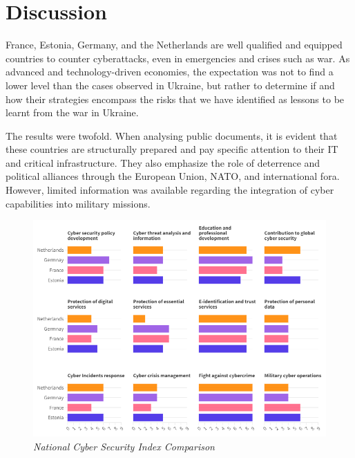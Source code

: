 \newpage

\section{Discussion}
France, Estonia, Germany, and the Netherlands are well qualified and equipped countries to counter cyberattacks, even in emergencies and crises such as war. As advanced and technology-driven economies, the expectation was not to find a lower level than the cases observed in Ukraine, but rather to determine if and how their strategies encompass the risks that we have identified as lessons to be learnt from the war in Ukraine.

The results were twofold. When analysing public documents, it is evident that these countries are structurally prepared and pay specific attention to their IT and critical infrastructure. They also emphasize the role of deterrence and political alliances through the European Union, NATO, and international fora. However, limited information was available regarding the integration of cyber capabilities into military missions.

\begin{figure}[H]
    \centering
    \includegraphics[width=1\textwidth]{Images/ncsi_index.png}
    \caption{\textit{National Cyber Security Index Comparison}}
    \label{fig:ncsi_index}
\end{figure}

